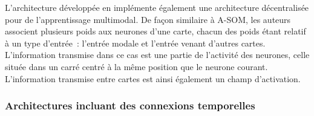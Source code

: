 \documentclass[../main]{subfiles}
\begin{document}
L'architecture développée en \cite{lefort_active_2015} implémente également une architecture décentralisée pour de l'apprentissage multimodal. De façon similaire à A-SOM, les auteurs associent plusieurs poids aux neurones d'une carte, chacun des poids étant relatif à un type d'entrée~: l'entrée modale et l'entrée venant d'autres cartes. L'information transmise dans ce cas est une partie de l'activité des neurones, celle située dans un carré centré à la même position que le neurone courant. L'information transmise entre cartes est ainsi également un champ d'activation.

\subsubsection{Architectures incluant des connexions temporelles}
\end{document}
